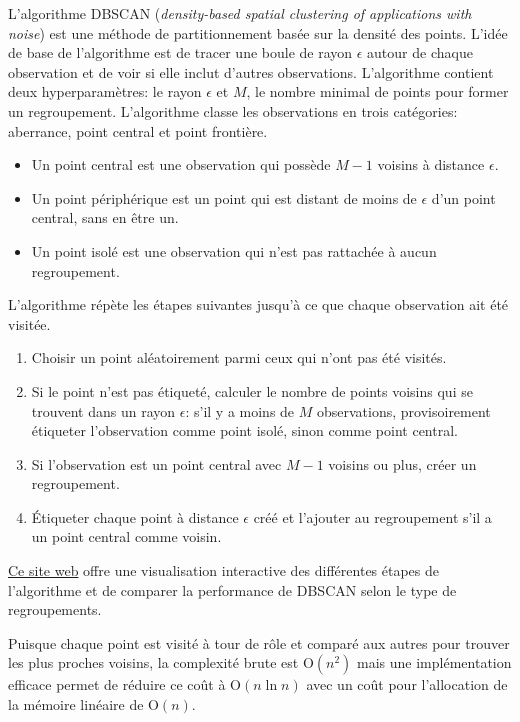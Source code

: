 \documentclass[
  11pt,
  letterpaper,
]{scrbook}
\providecommand{\tightlist}{%
  \setlength{\itemsep}{0pt}\setlength{\parskip}{0pt}}\usepackage{longtable,booktabs,array}
\theoremstyle{definition}
\theoremstyle{remark}
\begin{document}
L'algorithme DBSCAN (\emph{density-based spatial clustering of
applications with noise}) est une méthode de partitionnement basée sur
la densité des points. L'idée de base de l'algorithme est de tracer une
boule de rayon \(\epsilon\) autour de chaque observation et de voir si
elle inclut d'autres observations. L'algorithme contient deux
hyperparamètres: le rayon \(\epsilon\) et \(M\), le nombre minimal de
points pour former un regroupement. L'algorithme classe les observations
en trois catégories: aberrance, point central et point frontière.

\begin{itemize}
\tightlist
\item
  Un point central est une observation qui possède \(M-1\) voisins à
  distance \(\epsilon\).
\item
  Un point périphérique est un point qui est distant de moins de
  \(\epsilon\) d'un point central, sans en être un.
\item
  Un point isolé est une observation qui n'est pas rattachée à aucun
  regroupement.
\end{itemize}

L'algorithme répète les étapes suivantes jusqu'à ce que chaque
observation ait été visitée.

\begin{enumerate}
\def\labelenumi{\arabic{enumi}.}
\tightlist
\item
  Choisir un point aléatoirement parmi ceux qui n'ont pas été visités.
\item
  Si le point n'est pas étiqueté, calculer le nombre de points voisins
  qui se trouvent dans un rayon \(\epsilon\): s'il y a moins de \(M\)
  observations, provisoirement étiqueter l'observation comme point
  isolé, sinon comme point central.
\item
  Si l'observation est un point central avec \(M-1\) voisins ou plus,
  créer un regroupement.
\item
  Étiqueter chaque point à distance \(\epsilon\) créé et l'ajouter au
  regroupement s'il a un point central comme voisin.
\end{enumerate}

\href{https://www.naftaliharris.com/blog/visualizing-dbscan-clustering/}{Ce
site web} offre une visualisation interactive des différentes étapes de
l'algorithme et de comparer la performance de DBSCAN selon le type de
regroupements.

Puisque chaque point est visité à tour de rôle et comparé aux autres
pour trouver les plus proches voisins, la complexité brute est
\(\mathrm{O}(n^2)\) mais une implémentation efficace permet de réduire
ce coût à \(\mathrm{O}(n\ln n)\) avec un coût pour l'allocation de la
mémoire linéaire de \(\mathrm{O}(n)\).
\end{document}
